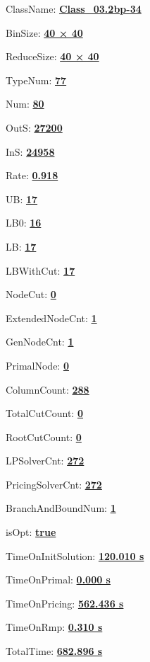 \documentclass[11pt]{article}
\begin{document}
\pagestyle{empty}


ClassName: \underline{\textbf{Class_03.2bp-34}}
\par
BinSize: \underline{\textbf{40 × 40}}
\par
ReduceSize: \underline{\textbf{40 × 40}}
\par
TypeNum: \underline{\textbf{77}}
\par
Num: \underline{\textbf{80}}
\par
OutS: \underline{\textbf{27200}}
\par
InS: \underline{\textbf{24958}}
\par
Rate: \underline{\textbf{0.918}}
\par
UB: \underline{\textbf{17}}
\par
LB0: \underline{\textbf{16}}
\par
LB: \underline{\textbf{17}}
\par
LBWithCut: \underline{\textbf{17}}
\par
NodeCut: \underline{\textbf{0}}
\par
ExtendedNodeCnt: \underline{\textbf{1}}
\par
GenNodeCnt: \underline{\textbf{1}}
\par
PrimalNode: \underline{\textbf{0}}
\par
ColumnCount: \underline{\textbf{288}}
\par
TotalCutCount: \underline{\textbf{0}}
\par
RootCutCount: \underline{\textbf{0}}
\par
LPSolverCnt: \underline{\textbf{272}}
\par
PricingSolverCnt: \underline{\textbf{272}}
\par
BranchAndBoundNum: \underline{\textbf{1}}
\par
isOpt: \underline{\textbf{true}}
\par
TimeOnInitSolution: \underline{\textbf{120.010 s}}
\par
TimeOnPrimal: \underline{\textbf{0.000 s}}
\par
TimeOnPricing: \underline{\textbf{562.436 s}}
\par
TimeOnRmp: \underline{\textbf{0.310 s}}
\par
TotalTime: \underline{\textbf{682.896 s}}
\par
\newpage


\end{document}
